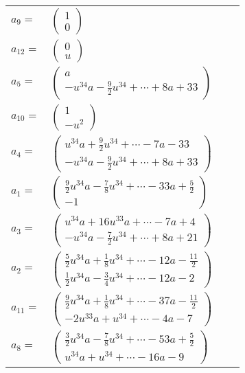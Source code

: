 \documentclass[1p]{elsarticle_modified}
\theoremstyle{definition}
\begin{document}
\begin{tabular}{m{7pt} m{180pt} m{7pt} m{180pt} }
\flushright $a_{9}=$&$\begin{pmatrix}1\\0\end{pmatrix}$ \\
\flushright $a_{12}=$&$\begin{pmatrix}0\\u\end{pmatrix}$ \\
\flushright $a_{5}=$&$\begin{pmatrix}a\\- u^{34} a-\frac{9}{2} u^{34}+\cdots+8 a+33\end{pmatrix}$ \\
\flushright $a_{10}=$&$\begin{pmatrix}1\\- u^2\end{pmatrix}$ \\
\flushright $a_{4}=$&$\begin{pmatrix}u^{34} a+\frac{9}{2} u^{34}+\cdots-7 a-33\\- u^{34} a-\frac{9}{2} u^{34}+\cdots+8 a+33\end{pmatrix}$ \\
\flushright $a_{1}=$&$\begin{pmatrix}\frac{9}{2} u^{34} a-\frac{7}{8} u^{34}+\cdots-33 a+\frac{5}{2}\\-1\end{pmatrix}$ \\
\flushright $a_{3}=$&$\begin{pmatrix}u^{34} a+16 u^{33} a+\cdots-7 a+4\\- u^{34} a-\frac{7}{2} u^{34}+\cdots+8 a+21\end{pmatrix}$ \\
\flushright $a_{2}=$&$\begin{pmatrix}\frac{5}{2} u^{34} a+\frac{1}{8} u^{34}+\cdots-12 a-\frac{11}{2}\\\frac{1}{2} u^{34} a-\frac{3}{4} u^{34}+\cdots-12 a-2\end{pmatrix}$ \\
\flushright $a_{11}=$&$\begin{pmatrix}\frac{9}{2} u^{34} a+\frac{1}{8} u^{34}+\cdots-37 a-\frac{11}{2}\\-2 u^{33} a+u^{34}+\cdots-4 a-7\end{pmatrix}$ \\
\flushright $a_{8}=$&$\begin{pmatrix}\frac{3}{2} u^{34} a-\frac{7}{8} u^{34}+\cdots-53 a+\frac{5}{2}\\u^{34} a+u^{34}+\cdots-16 a-9\end{pmatrix}$ \\

\end{tabular}
\end{document}
